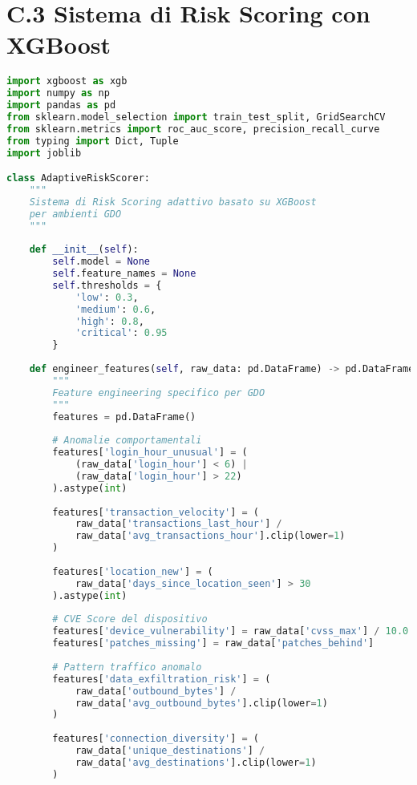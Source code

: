 \section{C.3 Sistema di Risk Scoring con XGBoost}

\begin{lstlisting}[language=Python, caption=Implementazione Risk Scoring adattivo con XGBoost]
import xgboost as xgb
import numpy as np
import pandas as pd
from sklearn.model_selection import train_test_split, GridSearchCV
from sklearn.metrics import roc_auc_score, precision_recall_curve
from typing import Dict, Tuple
import joblib

class AdaptiveRiskScorer:
    """
    Sistema di Risk Scoring adattivo basato su XGBoost
    per ambienti GDO
    """
    
    def __init__(self):
        self.model = None
        self.feature_names = None
        self.thresholds = {
            'low': 0.3,
            'medium': 0.6,
            'high': 0.8,
            'critical': 0.95
        }
        
    def engineer_features(self, raw_data: pd.DataFrame) -> pd.DataFrame:
        """
        Feature engineering specifico per GDO
        """
        features = pd.DataFrame()
        
        # Anomalie comportamentali
        features['login_hour_unusual'] = (
            (raw_data['login_hour'] < 6) | 
            (raw_data['login_hour'] > 22)
        ).astype(int)
        
        features['transaction_velocity'] = (
            raw_data['transactions_last_hour'] / 
            raw_data['avg_transactions_hour'].clip(lower=1)
        )
        
        features['location_new'] = (
            raw_data['days_since_location_seen'] > 30
        ).astype(int)
        
        # CVE Score del dispositivo
        features['device_vulnerability'] = raw_data['cvss_max'] / 10.0
        features['patches_missing'] = raw_data['patches_behind']
        
        # Pattern traffico anomalo
        features['data_exfiltration_risk'] = (
            raw_data['outbound_bytes'] / 
            raw_data['avg_outbound_bytes'].clip(lower=1)
        )
        
        features['connection_diversity'] = (
            raw_data['unique_destinations'] / 
            raw_data['avg_destinations'].clip(lower=1)
        )
        

\end{lstlisting}
